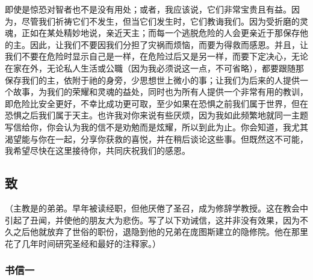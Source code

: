 即使是惊恐对智者也不是没有用处；或者，我应该说，它们非常宝贵且有益。因为，尽管我们祈祷它们不发生，但当它们发生时，它们教诲我们。因为受折磨的灵魂，正如在某处精妙地说，亲近天主；而每一个逃脱危险的人会更亲近于那保存他的主。因此，让我们不要因我们分担了灾祸而烦恼，而要为得救而感恩。并且，让我们不要在危险时显示自己是一样，在危险过后又是另一样，而要下定决心，无论在家在外，无论私人生活或公職（因为我必须说这一点，不可省略），都要跟随那保存我们的主，依附于祂的身旁，少思想世上微小的事；让我们为后来的人提供一个故事，为我们的荣耀和灵魂的益处，同时也为所有人提供一个非常有用的教训，即危险比安全更好，不幸比成功更可取，至少如果在恐惧之前我们属于世界，但在恐惧之后我们属于天主。也许我对你来说有些厌烦，因为我如此频繁地就同一主题写信给你，你会认为我的信不是劝勉而是炫耀，所以到此为止。你会知道，我尤其渴望能与你在一起，分享你获救的喜悦，并在稍后谈论这些事。但既然这不可能，我希望尽快在这里接待你，共同庆祝我们的感恩。\par


\subsection{致}

（主教是的弟弟。早年被读经职，但他厌倦了圣召，成为修辞学教授。这在教会中引起了丑闻，并使他的朋友大为悲伤。写了以下劝诫信，这并非没有效果，因为不久之后他就放弃了世俗的职份，退隐到他的兄弟在庞图斯建立的隐修院。他在那里花了几年时间研究圣经和最好的注释家。）\par


\subsubsection{书信一}

